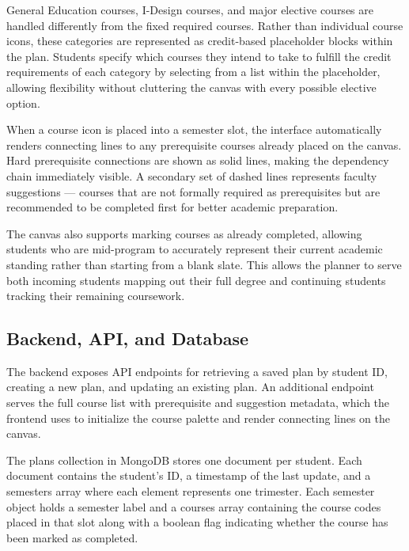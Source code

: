 General Education courses, I-Design courses, and major elective courses are handled differently from the fixed required courses. Rather than individual course icons, these categories are represented as credit-based placeholder blocks within the plan. Students specify which courses they intend to take to fulfill the credit requirements of each category by selecting from a list within the placeholder, allowing flexibility without cluttering the canvas with every possible elective option.

When a course icon is placed into a semester slot, the interface automatically renders connecting lines to any prerequisite courses already placed on the canvas. Hard prerequisite connections are shown as solid lines, making the dependency chain immediately visible. A secondary set of dashed lines represents faculty suggestions — courses that are not formally required as prerequisites but are recommended to be completed first for better academic preparation. 

The canvas also supports marking courses as already completed, allowing students who are mid-program to accurately represent their current academic standing rather than starting from a blank slate. This allows the planner to serve both incoming students mapping out their full degree and continuing students tracking their remaining coursework.

\subsection{Backend, API, and Database}
The backend exposes API endpoints for retrieving a saved plan by student ID, creating a new plan, and updating an existing plan. An additional endpoint serves the full course list with prerequisite and suggestion metadata, which the frontend uses to initialize the course palette and render connecting lines on the canvas.

The plans collection in MongoDB stores one document per student. Each document contains the student's ID, a timestamp of the last update, and a semesters array where each element represents one trimester. Each semester object holds a semester label and a courses array containing the course codes placed in that slot along with a boolean flag indicating whether the course has been marked as completed. 

